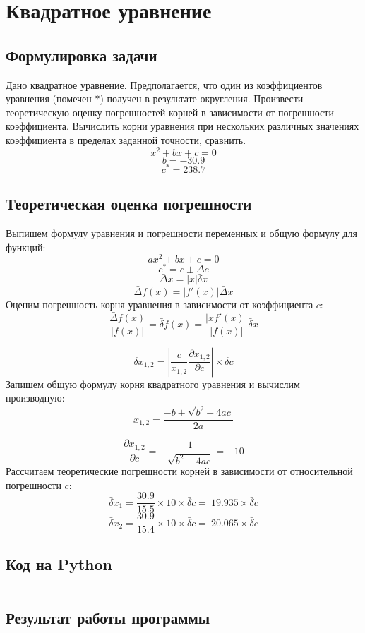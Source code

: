 \documentclass[a4paper,12pt]{article}
\newenvironment{longlisting}{\captionsetup{type=listing}}{}
\begin{document}
\section{Квадратное уравнение}
\subsection{Формулировка задачи}
Дано квадратное уравнение. Предполагается, что один из коэффициентов уравнения (помечен $*$) получен в результате округления. Произвести теоретическую оценку погрешностей корней в зависимости от погрешности коэффициента. Вычислить корни уравнения при нескольких различных значениях коэффициента в пределах заданной точности, сравнить.
$$x^2+bx+c = 0$$
$$b = -30.9$$
$$c^* = 238.7 $$
    
\subsection{Теоретическая оценка погрешности}

Выпишем формулу уравнения и погрешности переменных и общую формулу для функций:
$$ax^2 + bx + c = 0$$
$$c^* = c \pm \Delta c$$
$$\bar{\Delta} x = |x| \bar{\delta} x$$
$$\bar{\Delta} f(x) = |f'(x)| \bar{\Delta} x$$
Оценим погрешность корня уравнения в зависимости от коэффициента $c$:
$$\frac{\bar{\Delta} f(x)}{|f(x)|} = \bar{\delta} f(x) = \frac{|xf'(x)|}{|f(x)|}\bar{\delta}x$$

$$\bar{\delta} x_{1,2} = |\frac{c}{x_{1,2}} \frac{\partial x_{1,2}}{\partial c} | \times \bar{\delta} c$$
Запишем общую формулу корня квадратного уравнения и вычислим производную:
$$x_{1,2} = \frac{-b \pm \sqrt{b^2-4ac}}{2a} $$

$$\frac{\partial x_{1,2}}{\partial c} = -\frac{1}{\sqrt{b^2-4ac}} = -10$$
Рассчитаем теоретические погрешности корней в зависимости от относительной погрешности $c$:
$$\bar{\delta} x_{1} = \frac{30.9}{15.5} \times 10 \times \bar{\delta} c = ~19.935 \times \bar{\delta} c $$
$$\bar{\delta} x_{2} = \frac{30.9}{15.4} \times 10 \times \bar{\delta} c = ~20.065 \times \bar{\delta} c$$
   
\subsection{Код на Python}
\begin{longlisting}
\inputminted{python}{src/quadratic_eq.py}
\end{longlisting}

\subsection{Результат работы программы}
\begin{longlisting}

\end{longlisting}
\end{document}
